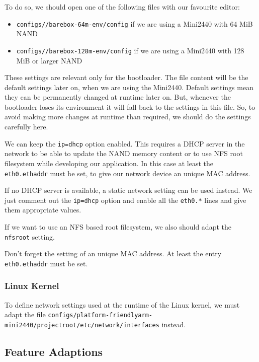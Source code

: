 To do so, we should open one of the following files with our favourite editor:

\begin{itemize}
 \item \texttt{configs/\ptxdistPlatformName /barebox-64m-env/config} if we are using
 a Mini2440 with 64 MiB NAND
 \item \texttt{configs/\ptxdistPlatformName /barebox-128m-env/config} if we are using
 a Mini2440 with 128 MiB or larger NAND
\end{itemize}

These settings are relevant only for the bootloader. The file content will be
the default settings later on, when we are using the Mini2440. Default
settings mean they can be permanently changed at runtime later on. But, whenever
the bootloader loses its environment it will fall back to the settings in this
file. So, to avoid making more changes at runtime than required, we should do the
settings carefully here.

We can keep the \texttt{ip=dhcp} option enabled. This requires a DHCP server in
the network to be able to update the NAND memory content or to use NFS root
filesystem while developing our application. In this case at least the
\texttt{eth0.ethaddr} must be set, to give our network device an unique MAC
address.

If no DHCP server is available, a static network setting can be used instead.
We just comment out the \texttt{ip=dhcp} option and enable all the
\texttt{eth0.*} lines and give them appropriate values.

If we want to use an NFS based root filesystem, we also should adapt the
\texttt{nfsroot} setting.

\begin{important}
Don't forget the setting of an unique MAC address. At least the entry
\texttt{eth0.ethaddr} must be set.
\end{important}

\subsubsection{Linux Kernel}			\label{sec:linuxnetwork}

To define network settings used at the runtime of the Linux kernel, we must
adapt the file
\texttt{configs/platform-friendlyarm-mini2440/projectroot/etc/network/interfaces}
instead.

\subsection{Feature Adaptions}		\label{sec:featureadaptions}

